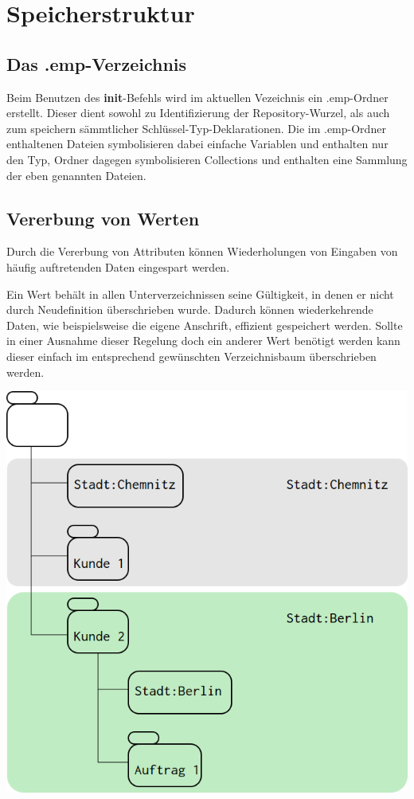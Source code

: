 
\section{Speicherstruktur}

\subsection{Das .emp-Verzeichnis}
Beim Benutzen des \textbf{init}-Befehls wird im aktuellen Vezeichnis ein .emp-Ordner erstellt. Dieser dient sowohl zu Identifizierung der Repository-Wurzel, als auch zum speichern sämmtlicher Schlüssel-Typ-Deklarationen.
Die im .emp-Ordner enthaltenen Dateien symbolisieren dabei einfache Variablen und enthalten nur den Typ, Ordner dagegen symbolisieren Collections und enthalten eine Sammlung der eben genannten Dateien.

\subsection{Vererbung von Werten}
Durch die Vererbung von Attributen können Wiederholungen von Eingaben von häufig auftretenden Daten eingespart werden.

Ein Wert behält in allen Unterverzeichnissen seine Gültigkeit, in denen er nicht durch Neudefinition überschrieben wurde. Dadurch können wiederkehrende Daten, wie beispielsweise die eigene Anschrift, effizient gespeichert werden. Sollte in einer Ausnahme dieser Regelung doch ein anderer Wert benötigt werden kann dieser einfach im entsprechend gewünschten Verzeichnisbaum überschrieben werden.

\includegraphics[width=\textwidth]{speicherstruktur.png}

